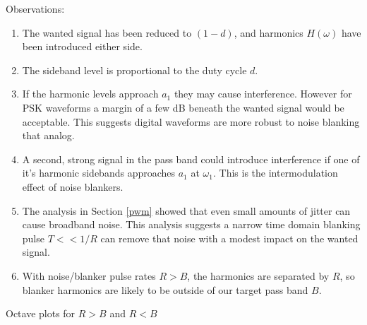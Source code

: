 \documentclass{article}
\begin{document}
Observations:
\begin{enumerate}
\item The wanted signal has been reduced to $(1-d)$, and harmonics $H(\omega)$ have been introduced either side.
\item The sideband level is proportional to the duty cycle $d$.
\item If the harmonic levels approach $a_1$ they may cause interference.  However for PSK waveforms a margin of a few dB beneath the wanted signal would be acceptable.  This suggests digital waveforms are more robust to noise blanking that analog. 
\item A second, strong signal in the pass band could introduce interference if one of it's harmonic sidebands approaches $a_1$ at $\omega_1$.  This is the intermodulation effect of noise blankers.
\item The analysis in Section \ref{pwm} showed that even small amounts of jitter can cause broadband noise.  This analysis suggests a narrow time domain blanking pulse $T<<1/R$ can remove that noise with a modest impact on the wanted signal. 
\item With noise/blanker pulse rates $R>B$, the harmonics are separated by $R$, so blanker harmonics are likely to be outside of our target pass band $B$.
\end{enumerate}

Octave plots for $R>B$ and $R<B$



\end{document}
